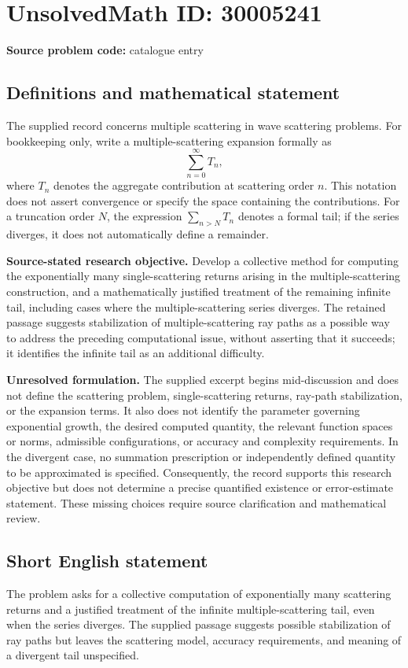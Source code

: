 \documentclass[11pt]{article}
\begin{document}
\section*{UnsolvedMath ID: 30005241}
\textbf{Source problem code:} catalogue entry
\subsection{Definitions and mathematical statement}
The supplied record concerns multiple scattering in wave scattering problems. For bookkeeping only, write a multiple-scattering expansion formally as
\[
\sum_{n=0}^{\infty} T_n,
\]
where \(T_n\) denotes the aggregate contribution at scattering order \(n\). This notation does not assert convergence or specify the space containing the contributions. For a truncation order \(N\), the expression \(\sum_{n>N}T_n\) denotes a formal tail; if the series diverges, it does not automatically define a remainder.

\textbf{Source-stated research objective.} Develop a collective method for computing the exponentially many single-scattering returns arising in the multiple-scattering construction, and a mathematically justified treatment of the remaining infinite tail, including cases where the multiple-scattering series diverges. The retained passage suggests stabilization of multiple-scattering ray paths as a possible way to address the preceding computational issue, without asserting that it succeeds; it identifies the infinite tail as an additional difficulty.

\textbf{Unresolved formulation.} The supplied excerpt begins mid-discussion and does not define the scattering problem, single-scattering returns, ray-path stabilization, or the expansion terms. It also does not identify the parameter governing exponential growth, the desired computed quantity, the relevant function spaces or norms, admissible configurations, or accuracy and complexity requirements. In the divergent case, no summation prescription or independently defined quantity to be approximated is specified. Consequently, the record supports this research objective but does not determine a precise quantified existence or error-estimate statement. These missing choices require source clarification and mathematical review.
\subsection{Short English statement}
The problem asks for a collective computation of exponentially many scattering returns and a justified treatment of the infinite multiple-scattering tail, even when the series diverges. The supplied passage suggests possible stabilization of ray paths but leaves the scattering model, accuracy requirements, and meaning of a divergent tail unspecified.
\end{document}
